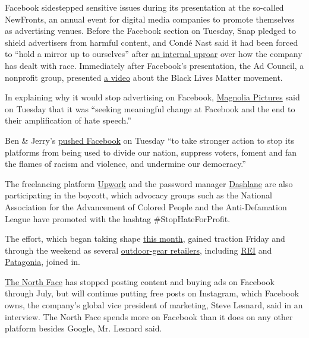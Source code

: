 Facebook sidestepped sensitive issues during its presentation at the
so-called NewFronts, an annual event for digital media companies to
promote themselves as advertising venues. Before the Facebook section on
Tuesday, Snap pledged to shield advertisers from harmful content, and
Condé Nast said it had been forced to ``hold a mirror up to ourselves''
after
\href{https://www.nytimes3xbfgragh.onion/2020/06/13/business/media/conde-nast-racial.html}{an
internal uproar} over how the company has dealt with race. Immediately
after Facebook's presentation, the Ad Council, a nonprofit group,
presented \href{https://www.youtube.com/watch?v=Y8_598SQAts}{a video}
about the Black Lives Matter movement.

In explaining why it would stop advertising on Facebook,
\href{https://twitter.com/MagnoliaPics/status/1275420847151300615?s=20}{Magnolia
Pictures} said on Tuesday that it was ``seeking meaningful change at
Facebook and the end to their amplification of hate speech.''

Ben \& Jerry's
\href{https://www.benjerry.com/about-us/media-center/stop-hate-for-profit}{pushed
Facebook} on Tuesday ``to take stronger action to stop its platforms
from being used to divide our nation, suppress voters, foment and fan
the flames of racism and violence, and undermine our democracy.''

The freelancing platform
\href{https://twitter.com/Upwork/status/1274110997695873024?s=20}{Upwork}
and the password manager
\href{https://blog.dashlane.com/make-facebook-stop-hate/}{Dashlane} are
also participating in the boycott, which advocacy groups such as the
National Association for the Advancement of Colored People and the
Anti-Defamation League have promoted with the hashtag
\#StopHateForProfit.

The effort, which began taking shape
\href{https://www.nytimes3xbfgragh.onion/2020/06/09/business/media/facebook-advertisers-trump-zuckerberg.html}{this
month}, gained traction Friday and through the weekend as several
\href{https://twitter.com/Arcteryx/status/1275482126599639040?s=20}{outdoor-gear
retailers}, including
\href{https://twitter.com/REI/status/1274110350703554560?s=20}{REI} and
\href{https://twitter.com/patagonia/status/1274832569398292480}{Patagonia},
joined in.

\href{https://twitter.com/thenorthface/status/1273985578564870145?s=20}{The
North Face} has stopped posting content and buying ads on Facebook
through July, but will continue putting free posts on Instagram, which
Facebook owns, the company's global vice president of marketing, Steve
Lesnard, said in an interview. The North Face spends more on Facebook
than it does on any other platform besides Google, Mr. Lesnard said.

